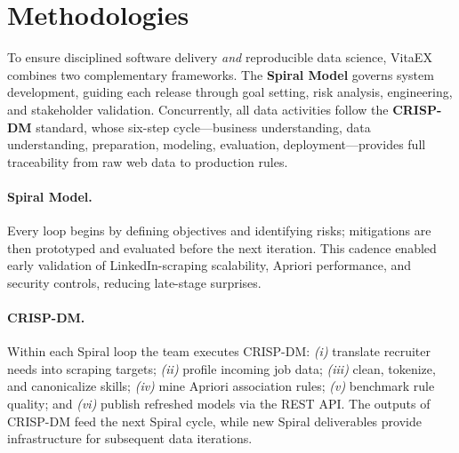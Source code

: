 \documentclass[runningheads]{llncs}
\begin{document}
\section{Methodologies}
\label{sec:methodologies}

To ensure disciplined software delivery \emph{and} reproducible data science, VitaEX combines two complementary frameworks.  
The \textbf{Spiral Model} governs system development, guiding each release through goal setting, risk analysis, engineering, and stakeholder validation.  
Concurrently, all data activities follow the \textbf{CRISP-DM} standard, whose six-step cycle—business understanding, data understanding, preparation, modeling, evaluation, deployment—provides full traceability from raw web data to production rules.

\paragraph{\textbf{Spiral Model.}}
Every loop begins by defining objectives and identifying risks; mitigations are then prototyped and evaluated before the next iteration.  
This cadence enabled early validation of LinkedIn-scraping scalability, Apriori performance, and security controls, reducing late-stage surprises.

\paragraph{\textbf{CRISP-DM.}}
Within each Spiral loop the team executes CRISP-DM:  
\emph{(i)} translate recruiter needs into scraping targets;  
\emph{(ii)} profile incoming job data;  
\emph{(iii)} clean, tokenize, and canonicalize skills;  
\emph{(iv)} mine Apriori association rules;  
\emph{(v)} benchmark rule quality; and  
\emph{(vi)} publish refreshed models via the REST API.  
The outputs of CRISP-DM feed the next Spiral cycle, while new Spiral deliverables provide infrastructure for subsequent data iterations.
\end{document}
